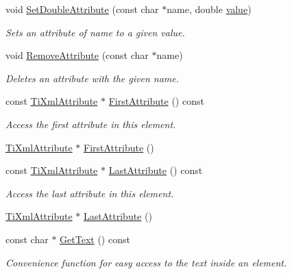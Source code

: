 \begin{DoxyCompactItemize}
void \hyperlink{classTiXmlElement_a0d1dd975d75496778177e35abfe0ec0b}{SetDoubleAttribute} (const char $\ast$name, double \hyperlink{classTiXmlNode_aead528b3cedc33c16a6c539872c7cc8b}{value})
\begin{DoxyCompactList}\small\item\em Sets an attribute of name to a given value. \item\end{DoxyCompactList}\item 
void \hyperlink{classTiXmlElement_a56979767deca794376b1dfa69a525b2a}{RemoveAttribute} (const char $\ast$name)
\begin{DoxyCompactList}\small\item\em Deletes an attribute with the given name. \item\end{DoxyCompactList}\item 
const \hyperlink{classTiXmlAttribute}{TiXmlAttribute} $\ast$ \hyperlink{classTiXmlElement_a516054c9073647d6cb29b6abe9fa0592}{FirstAttribute} () const 
\begin{DoxyCompactList}\small\item\em Access the first attribute in this element. \item\end{DoxyCompactList}\item 
\hyperlink{classTiXmlAttribute}{TiXmlAttribute} $\ast$ \hyperlink{classTiXmlElement_a4b33780fc565d38d6b54f640e0cf1737}{FirstAttribute} ()
\item 
const \hyperlink{classTiXmlAttribute}{TiXmlAttribute} $\ast$ \hyperlink{classTiXmlElement_a86191b49f9177be132b85b14655f1381}{LastAttribute} () const 
\begin{DoxyCompactList}\small\item\em Access the last attribute in this element. \item\end{DoxyCompactList}\item 
\hyperlink{classTiXmlAttribute}{TiXmlAttribute} $\ast$ \hyperlink{classTiXmlElement_a222f81cf06155cd108f2a68d4d176004}{LastAttribute} ()
\item 
const char $\ast$ \hyperlink{classTiXmlElement_aa6dedd8a146acf3b1bc0903deb2d411a}{GetText} () const 
\begin{DoxyCompactList}\small\item\em Convenience function for easy access to the text inside an element. \item\end{DoxyCompactList}\item 

\end{DoxyCompactItemize}
